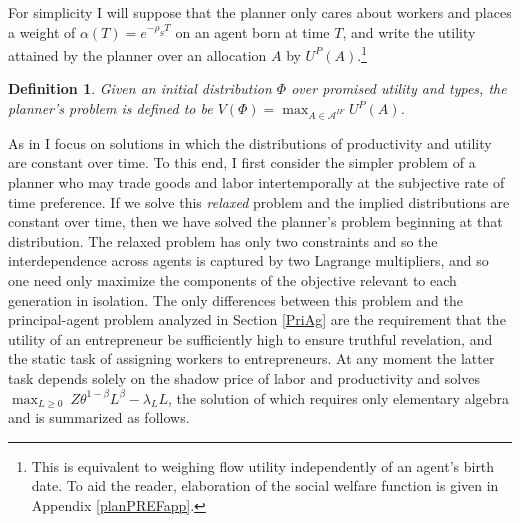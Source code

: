 \documentclass[11pt]{article}
\theoremstyle{plain}
\newtheorem{defn}{Definition}[section]
\begin{document}
For simplicity I will suppose that the planner only cares about workers and places a weight of $\alpha(T) = e^{-\rho_S T}$ on an agent born at time $T$, and write the utility attained by the planner over an allocation $A$ by $U^P(A)$.\footnote{This is equivalent to weighing flow utility independently of an agent's birth date. To aid the reader, elaboration of the social welfare function is given in Appendix \ref{planPREFapp}.} 

\begin{defn}
Given an initial distribution $\Phi$ over promised utility and types, the planner's problem is defined to be $V(\Phi) = \max_{A \in \mathcal{A}^{IF}} U^P(A)$.
\end{defn} 
As in \cite{farhi_inequality_2007} I focus on solutions in which the distributions of productivity and utility are constant over time. To this end, I first consider the simpler problem of a planner who may trade goods and labor intertemporally at the subjective rate of time preference. If we solve this \textit{relaxed} problem and the implied distributions are constant over time, then we have solved the planner's problem beginning at that distribution. The relaxed problem has only two constraints and so the interdependence across agents is captured by two Lagrange multipliers, and so one need only maximize the components of the objective relevant to each generation in isolation. The only differences between this problem and the principal-agent problem analyzed in Section \ref{PriAg} are the requirement that the utility of an entrepreneur be sufficiently high to ensure truthful revelation, and the static task of assigning workers to entrepreneurs. At any moment the latter task depends solely on the shadow price of labor and productivity and solves $\max_{L \geq 0} \ Z\theta^{1-\beta} L^{\beta} - \lambda_LL$, the solution of which requires only elementary algebra and is summarized as follows. 

\end{document}
